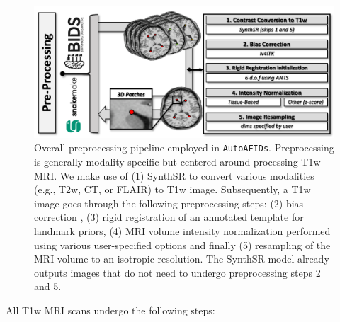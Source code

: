 \begin{figure}[hbt!]
    \centering
    \includegraphics[width=1\linewidth]{figs/ch3_Figure_proc.png}
    \caption{Overall preprocessing pipeline employed in \texttt{AutoAFIDs}. Preprocessing is generally modality specific but centered around processing T1w MRI. We make use of (1) SynthSR \cite{Iglesias2023-co} to convert various modalities (e.g., T2w, CT, or FLAIR) to T1w image. Subsequently, a T1w image goes through the following preprocessing steps: (2) bias correction \cite{Tustison2010-qu}, (3) rigid registration of an annotated template for landmark priors, (4) MRI volume intensity normalization performed using various user-specified options and finally (5) resampling of the MRI volume to an isotropic resolution. The SynthSR model already outputs images that do not need to undergo preprocessing steps 2 and 5.}
    \label{fig:ch3_Figure_proc}
\end{figure}


All T1w MRI scans undergo the following steps:

